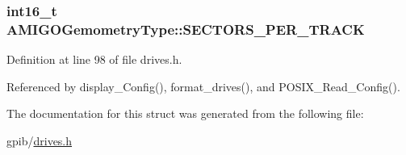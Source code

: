 \subsubsection[{\texorpdfstring{S\+E\+C\+T\+O\+R\+S\+\_\+\+P\+E\+R\+\_\+\+T\+R\+A\+CK}{SECTORS_PER_TRACK}}]{\setlength{\rightskip}{0pt plus 5cm}int16\+\_\+t A\+M\+I\+G\+O\+Gemometry\+Type\+::\+S\+E\+C\+T\+O\+R\+S\+\_\+\+P\+E\+R\+\_\+\+T\+R\+A\+CK}\hypertarget{structAMIGOGemometryType_a9ac647c76bd331ab5b1fd22a4f5b9a4a}{}\label{structAMIGOGemometryType_a9ac647c76bd331ab5b1fd22a4f5b9a4a}


Definition at line 98 of file drives.\+h.



Referenced by display\+\_\+\+Config(), format\+\_\+drives(), and P\+O\+S\+I\+X\+\_\+\+Read\+\_\+\+Config().



The documentation for this struct was generated from the following file\+:\begin{DoxyCompactItemize}
\item 
gpib/\hyperlink{drives_8h}{drives.\+h}\end{DoxyCompactItemize}
